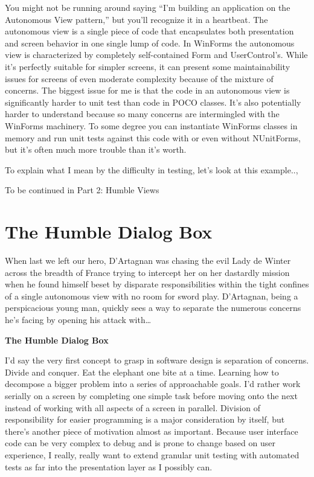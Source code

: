 \documentclass{article}
\begin{document}
{You might not be running around saying “I'm building an application on the Autonomous View pattern,” but you'll recognize it in a heartbeat.  The autonomous view is a single piece of code that encapsulates both presentation and screen behavior in one single lump of code.  In WinForms the autonomous view is characterized by completely self-contained Form and UserControl's.  While it's perfectly suitable for simpler screens, it can present some maintainability issues for screens of even moderate complexity because of the mixture of concerns.  The biggest issue for me is that the code in an autonomous view is significantly harder to unit test than code in POCO classes.  It's also potentially harder to understand because so many concerns are intermingled with the WinForms machinery.  To some degree you can instantiate WinForms classes in memory and run unit tests against this code with or even without NUnitForms, but it's often much more trouble than it's worth. 

To explain what I mean by the difficulty in testing, let's look at this example..,

To be continued in Part 2:  Humble Views


\section{ The Humble Dialog Box } 

When last we left our hero, D'Artagnan was chasing the evil Lady de Winter across the breadth of France trying to intercept her on her dastardly mission when he found himself beset by disparate responsibilities within the tight confines of a single autonomous view with no room for sword play.  D'Artagnan, being a perspicacious young man, quickly sees a way to separate the numerous concerns he's facing by opening his attack with…

\Large {\textbf{The Humble Dialog Box }}

I'd say the very first concept to grasp in software design is separation of concerns.  Divide and conquer.  Eat the elephant one bite at a time.  Learning how to decompose a bigger problem into a series of approachable goals.  I'd rather work serially on a screen by completing one simple task before moving onto the next instead of working with all aspects of a screen in parallel.  Division of responsibility for easier programming is a major consideration by itself, but there's another piece of motivation almost as important.  Because user interface code can be very complex to debug and is prone to change based on user experience, I really, really want to extend granular unit testing with automated tests as far into the presentation layer as I possibly can. 

}
\end{document}

